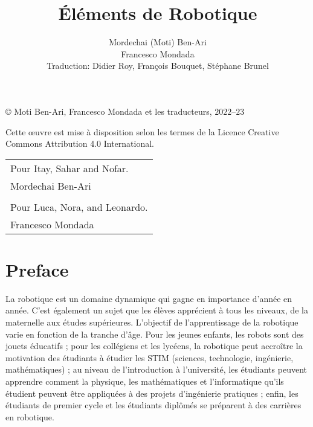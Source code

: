 
\author{Mordechai (Moti) Ben-Ari\\
\bigskip 
\bigskip 
Francesco Mondada\\
\bigskip
\bigskip
\bigskip
\bigskip
\bigskip
Traduction: Didier Roy, François Bouquet, Stéphane Brunel}
\title{Éléments de Robotique\\
\bigskip}
\date{}
\maketitle

\mbox{}
\vfill
\begin{center}
\copyright{} Moti Ben-Ari, Francesco Mondada et les traducteurs, $2022$--$23$
 \end{center}
\begin{small}
Cette œuvre est mise à disposition selon les termes de la Licence Creative Commons Attribution 4.0 International.
\end{small}
\vfill

\newpage
\mbox{}
\vfill
\begin{center}
\begin{tabular}{l}
Pour Itay, Sahar and Nofar.\\
Mordechai Ben-Ari\\
\\
Pour Luca, Nora, and Leonardo.\\
Francesco Mondada
\end{tabular}
\end{center}
\vfill
\mbox{}
\newpage

\chapter*{Preface}

La robotique est un domaine dynamique qui gagne en importance d'année en année. C'est également un sujet que les élèves apprécient à tous les niveaux, de la maternelle aux études supérieures. L'objectif de l'apprentissage de la robotique varie en fonction de la tranche d'âge. Pour les jeunes enfants, les robots sont des jouets éducatifs ; pour les collégiens et les lycéens, la robotique peut accroître la motivation des étudiants à étudier les STIM (sciences, technologie, ingénierie, mathématiques) ; au niveau de l'introduction à l'université, les étudiants peuvent apprendre comment la physique, les mathématiques et l'informatique qu'ils étudient peuvent être appliquées à des projets d'ingénierie pratiques ; enfin, les étudiants de premier cycle et les étudiants diplômés se préparent à des carrières en robotique.


